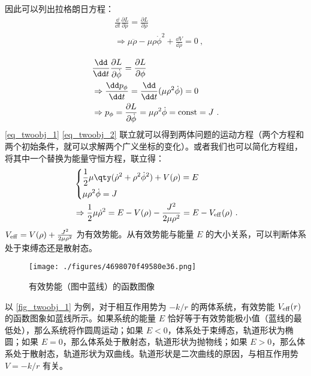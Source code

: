 因此可以列出拉格朗日方程：
\begin{equation}\label{eq_twoobj_1}
\begin{aligned}
&\frac{\dd }{\dd t}\frac{\partial L}{\partial \dot\rho}=\frac{\partial L}{\partial \rho}\\&\Rightarrow \mu\ddot\rho-\mu\rho\dot\phi^2+\frac{\dd V}{\dd \rho}=0~,
\end{aligned}
\end{equation}

\begin{equation}\label{eq_twoobj_2}
\begin{aligned}
&\frac{\dd }{\dd t}\frac{\partial L}{\partial \dot\phi}=\frac{\partial L}{\partial \phi}\\&
\Rightarrow \frac{\dd p_\phi}{\dd t}=\frac{\dd }{\dd t}(\mu \rho^2\dot\phi)=0
\\&
\Rightarrow p_\phi=\frac{\partial L}{\partial \dot \phi}=\mu\rho^2\dot\phi ={\rm const}=J ~.
\end{aligned}
\end{equation}
\autoref{eq_twoobj_1} \autoref{eq_twoobj_2} 联立就可以得到两体问题的运动方程（两个方程和两个初始条件，就可以求解两个广义坐标的变化）。或者我们也可以简化方程组，将其中一个替换为能量守恒方程，联立得：
\begin{equation}\label{eq_twoobj_3}
\begin{aligned}
&\left\{
\begin{aligned}
&\frac{1}{2}\mu \qty(\dot\rho^2+\rho^2\dot\phi^2)+V(\rho)=E\\
&\mu\rho^2\dot\phi=J
\end{aligned}
\right.\\
&\Rightarrow \frac{1}{2}\mu \dot\rho^2=E-V(\rho)-\frac{J^2}{2\mu\rho^2}=E-V_{\rm{eff}}(\rho)~.
\end{aligned}
\end{equation}
$V_{\rm{eff}}=V(\rho)+\frac{J^2}{2\mu\rho^2}$ 为有效势能。从有效势能与能量 $E$ 的大小关系，可以判断体系处于束缚态还是散射态。
\begin{figure}[ht]
\centering
\texttt{[image: ./figures/4698070f49580e36.png]}
\caption{有效势能（图中蓝线）的函数图像} \label{fig_twoobj_1}
\end{figure}
以 \autoref{fig_twoobj_1} 为例，对于相互作用势为 $-k/r$ 的两体系统，有效势能 $V_{\rm{eff}}(r)$ 的函数图象如蓝线所示。如果系统的能量 $E$ 恰好等于有效势能极小值（蓝线的最低处），那么系统将作圆周运动；如果 $E<0$，体系处于束缚态，轨道形状为椭圆；如果 $E=0$，那么体系处于散射态，轨道形状为抛物线；如果 $E>0$，那么体系处于散射态，轨道形状为双曲线。轨道形状是二次曲线的原因，与相互作用势 $V=-k/r$ 有关。

